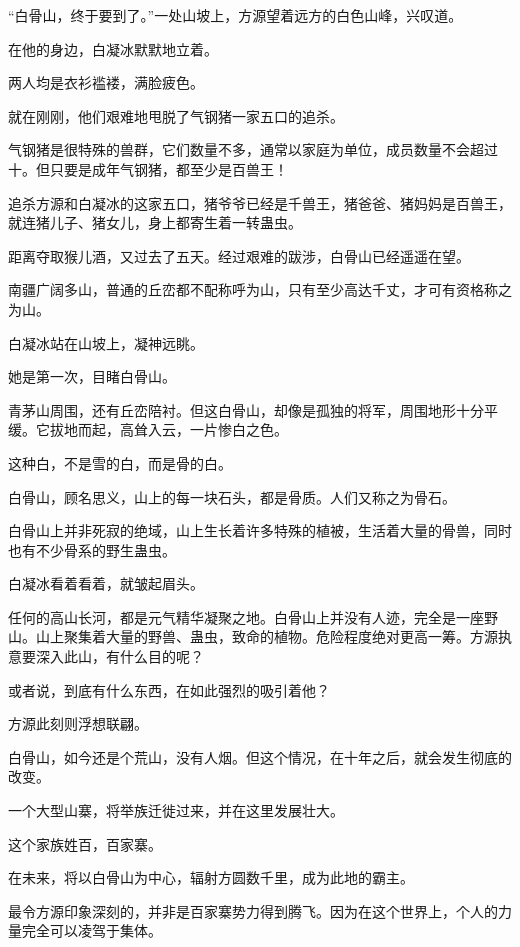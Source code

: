 
\begin{this_body}



“白骨山，终于要到了。”一处山坡上，方源望着远方的白色山峰，兴叹道。

在他的身边，白凝冰默默地立着。

两人均是衣衫褴褛，满脸疲色。

就在刚刚，他们艰难地甩脱了气钢猪一家五口的追杀。

气钢猪是很特殊的兽群，它们数量不多，通常以家庭为单位，成员数量不会超过十。但只要是成年气钢猪，都至少是百兽王！

追杀方源和白凝冰的这家五口，猪爷爷已经是千兽王，猪爸爸、猪妈妈是百兽王，就连猪儿子、猪女儿，身上都寄生着一转蛊虫。

距离夺取猴儿酒，又过去了五天。经过艰难的跋涉，白骨山已经遥遥在望。

南疆广阔多山，普通的丘峦都不配称呼为山，只有至少高达千丈，才可有资格称之为山。

白凝冰站在山坡上，凝神远眺。

她是第一次，目睹白骨山。

青茅山周围，还有丘峦陪衬。但这白骨山，却像是孤独的将军，周围地形十分平缓。它拔地而起，高耸入云，一片惨白之色。

这种白，不是雪的白，而是骨的白。

白骨山，顾名思义，山上的每一块石头，都是骨质。人们又称之为骨石。

白骨山上并非死寂的绝域，山上生长着许多特殊的植被，生活着大量的骨兽，同时也有不少骨系的野生蛊虫。

白凝冰看着看着，就皱起眉头。

任何的高山长河，都是元气精华凝聚之地。白骨山上并没有人迹，完全是一座野山。山上聚集着大量的野兽、蛊虫，致命的植物。危险程度绝对更高一筹。方源执意要深入此山，有什么目的呢？

或者说，到底有什么东西，在如此强烈的吸引着他？

方源此刻则浮想联翩。

白骨山，如今还是个荒山，没有人烟。但这个情况，在十年之后，就会发生彻底的改变。

一个大型山寨，将举族迁徙过来，并在这里发展壮大。

这个家族姓百，百家寨。

在未来，将以白骨山为中心，辐射方圆数千里，成为此地的霸主。

最令方源印象深刻的，并非是百家寨势力得到腾飞。因为在这个世界上，个人的力量完全可以凌驾于集体。


\end{this_body}
